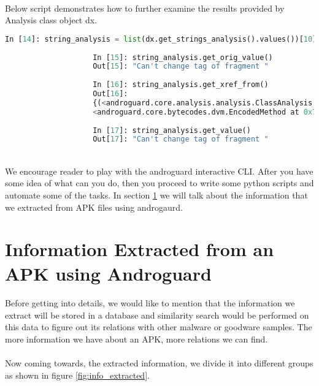 \documentclass[../main.tex]{subfile}
\begin{document}
			\paragraph{} Below script demonstrates how to further examine the results provided by Analysis class object dx.
				\begin{lstlisting}[language=python, firstnumber=93]
					In [14]: string_analysis = list(dx.get_strings_analysis().values())[10]
										
					In [15]: string_analysis.get_orig_value()
					Out[15]: "Can't change tag of fragment "
					
					In [16]: string_analysis.get_xref_from()
					Out[16]: 
					{(<androguard.core.analysis.analysis.ClassAnalysis at 0x7fd62588d320>,
					<androguard.core.bytecodes.dvm.EncodedMethod at 0x7fd626197b00>)}
					
					In [17]: string_analysis.get_value()
					Out[17]: "Can't change tag of fragment "
					
				\end{lstlisting}
				
			\paragraph{} We encourage reader to play with the androguard interactive CLI. After you have some idea of what can you do, then you proceed to write some python scripts and automate some of the tasks. In section \ref{sec:androgaurd_static_analysis} we will talk about the information that we extracted from APK files using androgaurd.
			
		
		\section{Information Extracted from an APK using Androguard}\label{sec:androgaurd_static_analysis}
		\paragraph{} Before getting into details, we would like to mention that the information we extract will be stored in a database and similarity search would be performed on this data to figure out its relations with other malware or goodware samples. The more information we have about an APK, more relations we can find.
		\paragraph{} Now coming towards, the extracted information, we divide it into different groups as shown in figure \ref{fig:info_extracted}.
		
\end{document}
